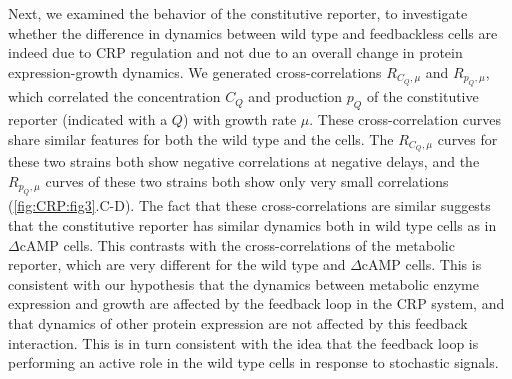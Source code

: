 Next, we examined the behavior of the constitutive reporter,
to investigate whether the difference in dynamics between wild type and feedbackless cells are indeed due to CRP regulation
and not due to an overall change in protein expression-growth dynamics.
%
%
We generated cross-correlations $R_{C_Q,\mu}$ and $R_{p_Q,\mu}$, which correlated the concentration $C_Q$ and production $p_Q$ of the constitutive reporter (indicated with a $Q$) with growth rate $\mu$.
%
These cross-correlation curves share similar features for both the wild type and the \dcamp cells.
%
The $R_{C_Q,\mu}$ curves for these two strains both show negative correlations at negative delays,
and the $R_{p_Q,\mu}$ curves of these two strains both show only very small correlations (\ref{fig:CRP:fig3}.C-D).
%
%
%
The fact that these cross-correlations are similar suggests 
that the constitutive reporter has similar dynamics both in wild type cells as in $\Delta$cAMP cells. 
%
This contrasts with the cross-correlations of the metabolic reporter, 
which are very different for the wild type and $\Delta$cAMP cells.
%
This is consistent with our hypothesis that the dynamics between metabolic enzyme expression and growth
are affected by the feedback loop in the CRP system, 
and that dynamics of other protein expression are not affected by this feedback interaction.
%
%
This is in turn consistent with the idea that the feedback loop is performing an active role in the wild type cells in response to stochastic signals.


%


